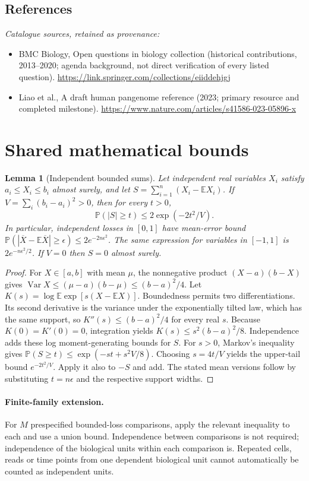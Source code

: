 \documentclass[11pt]{article}
\newcommand{\E}{\mathbb E}
\newcommand{\Prob}{\mathbb P}
\DeclareMathOperator{\Var}{Var}
\providecommand{\E}{\mathbb E}
\providecommand{\Prob}{\mathbb P}
\providecommand{\Var}{\operatorname{Var}}
\newtheorem{sharedlemma}{Lemma}[section]
\begin{document}
\subsection{References}
\noindent\emph{Catalogue sources, retained as provenance:}
\begin{itemize}
\item BMC Biology, Open questions in biology collection (historical contributions, 2013--2020; agenda background, not direct verification of every listed question). \url{https://link.springer.com/collections/eiiddehjgj}
\item Liao et al., A draft human pangenome reference (2023; primary resource and completed milestone). \url{https://www.nature.com/articles/s41586-023-05896-x}
\end{itemize}
\clearpage


\appendix
\section{Shared mathematical bounds}\label{app:bounds}
\begin{sharedlemma}[Independent bounded sums]\label{lem:bounded}
Let independent real variables $X_i$ satisfy $a_i\leq X_i\leq b_i$ almost surely,
and let $S=\sum_{i=1}^n(X_i-\E X_i)$. If
$V=\sum_i(b_i-a_i)^2>0$, then for every $t>0$,
\[
 \Prob(|S|\geq t)\leq 2\exp(-2t^2/V).
\]
In particular, independent losses in $[0,1]$ have mean-error bound
$\Prob(|\overline X-\E\overline X|\geq\epsilon)
\leq2e^{-2n\epsilon^2}$. The same expression for variables in $[-1,1]$
is $2e^{-n\epsilon^2/2}$. If $V=0$ then $S=0$ almost surely.
\end{sharedlemma}
\begin{proof}
For $X\in[a,b]$ with mean $\mu$, the nonnegative product
$(X-a)(b-X)$ gives
$\Var X\leq(\mu-a)(b-\mu)\leq(b-a)^2/4$.
Let $K(s)=\log\E\exp[s(X-\E X)]$.
Boundedness permits two differentiations. Its second derivative is the variance
under the exponentially tilted law, which has the same support, so
$K''(s)\leq(b-a)^2/4$ for every real $s$.
Because $K(0)=K'(0)=0$, integration yields
$K(s)\leq s^2(b-a)^2/8$.
Independence adds these log moment-generating bounds for $S$.
For $s>0$, Markov's inequality gives
$\Prob(S\geq t)\leq\exp(-st+s^2V/8)$.
Choosing $s=4t/V$ yields the upper-tail bound $e^{-2t^2/V}$.
Apply it also to $-S$ and add. The stated mean versions follow by substituting
$t=n\epsilon$ and the respective support widths.
\end{proof}

\paragraph{Finite-family extension.}
For $M$ prespecified bounded-loss comparisons, apply the relevant inequality to
each and use a union bound. Independence between comparisons is not required;
independence of the biological units within each comparison is. Repeated cells,
reads or time points from one dependent biological unit cannot automatically be
counted as independent units.
\end{document}

